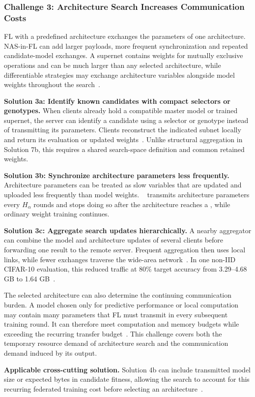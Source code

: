 \subsubsection{Challenge 3: Architecture Search Increases Communication Costs}

FL with a predefined architecture exchanges the parameters of one architecture. NAS-in-FL can add larger payloads, more frequent synchronization and repeated candidate-model exchanges. A supernet contains weights for mutually exclusive operations and can be much larger than any selected architecture, while differentiable strategies may exchange architecture variables alongside model weights throughout the search~\cite{fedoras_2022,hapfnas_2025,fednas_2021,fedregnas_2025}.

\noindent\textbf{Solution 3a: Identify known candidates with compact selectors or genotypes.} When clients already hold a compatible master model or trained supernet, the server can identify a candidate using a selector or genotype instead of transmitting its parameters. Clients reconstruct the indicated subnet locally and return its evaluation or updated weights~\cite{rt_fed_evo_nas_2020,medical_image_segmentation_fednas_2024,intrusion_detection_fednas_2024}. Unlike structural aggregation in Solution 7b, this requires a shared search-space definition and common retained weights.

\noindent\textbf{Solution 3b: Synchronize architecture parameters less frequently.} Architecture  parameters can be treated as slow variables that are updated and uploaded less frequently than model weights. ~\cite{fedregnas_2025} transmits architecture parameters every \(H_{\alpha}\) rounds and stops doing so after the architecture reaches a , while ordinary weight training continues.

\noindent\textbf{Solution 3c: Aggregate search updates hierarchically.} A nearby aggregator can combine the model and architecture updates of several clients before forwarding one result to the remote server. Frequent aggregation then uses local links, while fewer exchanges traverse the wide-area network~\cite{finch_2024}. In one non-IID CIFAR-10 evaluation, this reduced traffic at 80\% target accuracy from 3.29--4.68 GB to 1.64 GB~\cite{finch_2024}.

The selected architecture can also determine the continuing communication burden. A model chosen only for predictive performance or local computation may contain many parameters that FL must transmit in every subsequent training round. It can therefore meet computation and memory budgets while exceeding the recurring transfer budget~\cite{multi_objective_evo_fl_2020}. This challenge covers both the temporary resource demand of architecture search and the communication demand induced by its output.

\noindent\textbf{Applicable cross-cutting solution.} Solution 4b can include transmitted model size or expected bytes in candidate fitness, allowing the search to account for this recurring federated training cost before selecting an architecture~\cite{multi_objective_evo_fl_2020,fedregnas_2025}.
